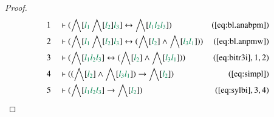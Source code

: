 \begin{proof}
\begin{align}
  1 &&  & \vdash ( \bigwedge[ \mwl{l_1} \bigwedge[ \mwl{l_2} ] \mwl{l_3} ]
      \leftrightarrow \bigwedge[ \mwl{l_1} \mwl{l_2}
      \mwl{l_3} ] )&(\mbox{\ref{eq:bl.anabpm}})\notag
  \\ 2 &&  & \vdash ( \bigwedge[ \mwl{l_1} \bigwedge[ \mwl{l_2} ] \mwl{l_3} ]
      \leftrightarrow ( \bigwedge[ \mwl{l_2} ] \wedge
      \bigwedge[ \mwl{l_3} \mwl{l_1} ] )
      )&(\mbox{\ref{eq:bl.anpmw}})\notag
  \\ 3 &&  & \vdash ( \bigwedge[ \mwl{l_1} \mwl{l_2} \mwl{l_3} ]
      \leftrightarrow ( \bigwedge[ \mwl{l_2} ] \wedge
      \bigwedge[ \mwl{l_3} \mwl{l_1} ] )
      )&(\mbox{\ref{eq:bitr3i}},1,2)\notag
  \\ 4 &&  & \vdash ( ( \bigwedge[ \mwl{l_2} ] \wedge \bigwedge[ \mwl{l_3}
      \mwl{l_1} ] ) \rightarrow \bigwedge[ \mwl{l_2} ]
      )&(\mbox{\ref{eq:simpl}})\notag
  \\ 5 &&  & \vdash ( \bigwedge[ \mwl{l_1} \mwl{l_2} \mwl{l_3} ] \rightarrow
      \bigwedge[ \mwl{l_2} ]
      )&(\mbox{\ref{eq:sylbi}},3,4)\notag
\end{align}
\end{proof}

